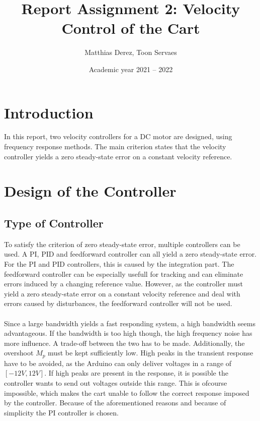 \documentclass[a4paper,kul]{kulakarticle} %
\date{Academic year 2021 -- 2022}
\title{Report Assignment 2: Velocity Control of the Cart}
\author{Matthias Derez, Toon Servaes}
\begin{document}
\maketitle

\tableofcontents
\listoffigures
\listoftables

\newpage
\section{Introduction}
In this report, two velocity controllers for a DC motor are designed, using frequency response methods. The main criterion states that the velocity controller yields a zero steady-state error on a constant velocity reference. 
\section{Design of the Controller}
\subsection{Type of Controller}
\label{sec: typecontroller}
To satisfy the criterion of zero steady-state error, multiple controllers can be used. A PI, PID and feedforward controller can all yield a zero steady-state error. For the PI and PID controllers, this is caused by the integration part. The feedforward controller can be especially usefull for tracking and can eliminate errors induced by a changing reference value. However, as the controller must yield a zero steady-state error on a constant velocity reference and deal with errors caused by disturbances, the feedforward controller will not be used. 
\\\\
Since a large bandwidth yields a fast responding system, a high bandwidth seems advantageous. If the bandwidth is too high though, the high frequency noise has more influence. A trade-off between the two has to be made. Additionally, the overshoot $M_p$ must be kept sufficiently low. High peaks in the transient response have to be avoided, as the Arduino can only deliver voltages in a range of $[-12V, 12V]$. If high peaks are present in the response, it is possible the controller wants to send out voltages outside this range. This is ofcourse impossible, which makes the cart unable to follow the correct response imposed by the controller. %
Because of the aforementioned reasons and because of simplicity the PI controller is chosen.
\end{document}
